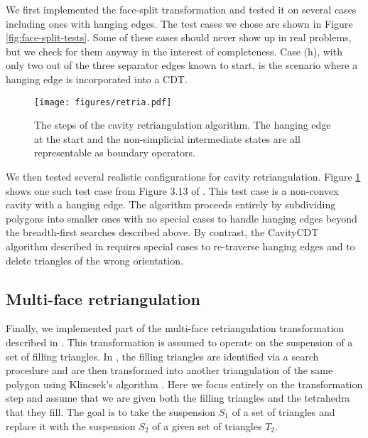 \documentclass[twocolumn]{article}
\begin{document}
We first implemented the face-split transformation and tested it on several cases including ones with hanging edges.
The test cases we chose are shown in Figure \ref{fig:face-split-tests}.
Some of these cases should never show up in real problems, but we check for them anyway in the interest of completeness.
Case (h), with only two out of the three separator edges known to start, is the scenario where a hanging edge is incorporated into a CDT.

\begin{figure}[t]
    \begin{center}
    \texttt{[image: figures/retria.pdf]}
    \end{center}
    \caption{The steps of the cavity retriangulation algorithm.
    The hanging edge at the start and the non-simplicial intermediate states are all representable as boundary operators.}
    \label{fig:cheng-dey-shewchuk-example}
\end{figure}

We then tested several realistic configurations for cavity retriangulation.
Figure \ref{fig:cheng-dey-shewchuk-example} shows one such test case from Figure 3.13 of \cite{cheng2013delaunay}.
This test case is a non-convex cavity with a hanging edge.
The algorithm proceeds entirely by subdividing polygons into smaller ones with no special cases to handle hanging edges beyond the breadth-first searches described above.
By contrast, the CavityCDT algorithm described in \cite{cheng2013delaunay} requires special cases to re-traverse hanging edges and to delete triangles of the wrong orientation.


\subsection{Multi-face retriangulation}

Finally, we implemented part of the multi-face retriangulation transformation described in \cite{misztal2009tetrahedral}.
This transformation is assumed to operate on the suspension of a set of filling triangles.
In \cite{misztal2009tetrahedral}, the filling triangles are identified via a search procedure and are then transformed into another triangulation of the same polygon using Klincsek's algorithm \cite{klincsek1980minimal}.
Here we focus entirely on the transformation step and assume that we are given both the filling triangles and the tetrahedra that they fill.
The goal is to take the suspension $S_1$ of a set of triangles and replace it with the suspension $S_2$ of a given set of triangles $T_2$.
\end{document}
